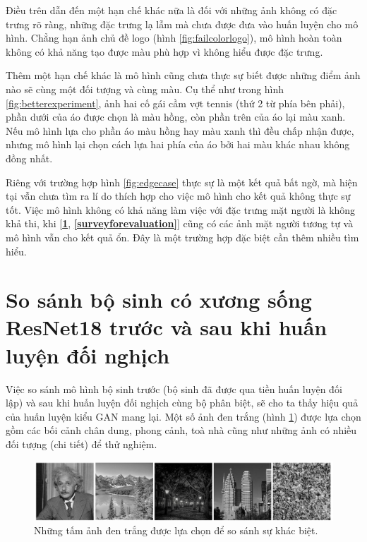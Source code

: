 \documentclass[a4paper, 12pt]{report}
\begin{document}
Điều trên dẫn đến một hạn chế khác nữa là đối với những ảnh không có đặc trưng rõ ràng, những đặc trưng lạ lẫm mà chưa được đưa vào huấn luyện cho mô hình.
Chẳng hạn ảnh chủ đề logo (hình \ref{fig:failcolorlogo}), mô hình hoàn toàn không có khả năng tạo được màu phù hợp vì không hiểu được đặc trưng.\vspace{5pt}

Thêm một hạn chế khác là mô hình cũng chưa thực sự biết được những điểm ảnh nào sẽ cùng một đối tượng và cùng màu.
Cụ thể như trong hình \ref{fig:betterexperiment}, ảnh hai cố gái cầm vợt tennis (thứ 2 từ phía bên phải), phần dưới của áo được chọn là màu hồng, còn phần trên của áo lại màu xanh.
Nếu mô hình lựa cho phần áo màu hồng hay màu xanh thì đều chấp nhận được, nhưng mô hình lại chọn cách lựa hai phía của áo bởi hai màu khác nhau không đồng nhất.\vspace{5pt}

Riêng với trường hợp hình \ref{fig:edgecase} thực sự là một kết quả bất ngờ, mà hiện tại vẫn chưa tìm ra lí do thích hợp cho việc mô hình cho kết quả không thực sự tốt.
Việc mô hình không có khả năng làm việc với đặc trưng mặt người là không khả thi, khi [\textbf{\ref{compare}}, \textbf{\ref{surveyforevaluation}}] cũng có các ảnh mặt người tương tự và mô hình vẫn cho kết quả ổn.
Đây là một trường hợp đặc biệt cần thêm nhiều tìm hiểu.

\section{So sánh bộ sinh có xương sống ResNet18 trước và sau khi huấn luyện đối nghịch}\label{compare}

Việc so sánh mô hình bộ sinh trước (bộ sinh đã được qua tiền huấn luyện đối lập) và sau khi huấn luyện đối nghịch cùng bộ phân biệt, sẽ cho ta thấy hiệu quả của huấn luyện kiểu GAN mang lại.
Một số ảnh đen trắng (hình \ref{fig:sampletotest}) được lựa chọn gồm các bối cảnh chân dung, phong cảnh, toà nhà cũng như những ảnh có nhiều đối tượng (chi tiết) để thử nghiệm.

\begin{figure}[!h]
\captionsetup{width=0.8\textwidth}
\centering
\includegraphics[width=15cm]{images/4_2.PNG}
\caption{Những tấm ảnh đen trắng được lựa chọn để so sánh sự khác biệt.}
\label{fig:sampletotest}
\end{figure}
\end{document}
